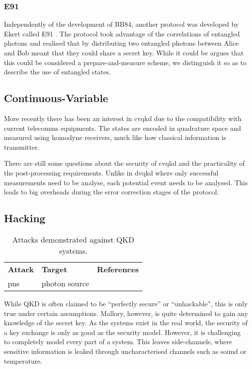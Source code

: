 \subsubsection*{E91}

Independently of the development of BB84, another protocol was developed by Ekert called E91 \cite{E91}. The protocol took advantage of the correlations of entangled photons and realised that by distributing two entangled photons between Alice and Bob meant that they could share a secret key. While it could be argues that this could be considered a prepare-and-measure scheme, we distinguish it so as to describe the use of entangled states.

\subsection{Continuous-Variable}

More recently there has been an interest in \ac{cvqkd} due to the compatibility with current telecomms equipments. The states are encoded in quadrature space and measured using homodyne receivers, much like how classical information is transmitter.

There are still some questions about the security of \ac{cvqkd} and the practicality of the post-processing requirements. Unlike in \ac{dvqkd} where only successful measurements need to be analyse, each potential event needs to be analysed. This leads to big overheads during the error correction stages of the protocol.

\subsection{Hacking}

\begin{table}[t]
\centering
\begin{tabular}{lll}
	\textbf{Attack} & \textbf{Target} & \textbf{References}\\ 
	\Acl{pns} & photon source &
\end{tabular}
\caption[Attacks demonstrated against \acs{QKD} systems]{Attacks demonstrated against \acs{QKD} systems.}
\end{table}

While \ac{QKD} is often claimed to be ``perfectly secure'' or ``unhackable'', this is only true under certain assumptions.  Mallory, however, is quite determined to gain any knowledge of the secret key. As the systems exist in the real world, the security of a key exchange is only as good as the security model. However, it is challenging to completely model every part of a system. This leaves side-channels, where sensitive information is leaked through uncharacterised channels such as sound or temperature.

